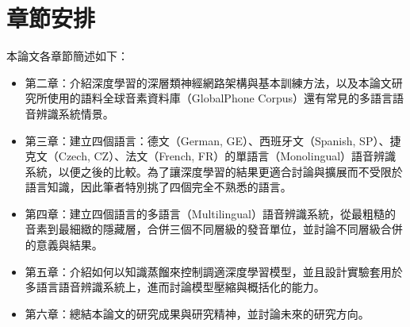 \section{章節安排}
本論文各章節簡述如下：
\begin{itemize}
\itemsep -2pt %
  \item  第二章：介紹深度學習的深層類神經網路架構與基本訓練方法，以及本論文研究所使用的語料全球音素資料庫（GlobalPhone Corpus）還有常見的多語言語音辨識系統情景。

  \item  第三章：建立四個語言：德文（German, GE）、西班牙文（Spanish, SP）、捷克文（Czech, CZ）、法文（French, FR）的單語言（Monolingual）語音辨識系統，以便之後的比較。為了讓深度學習的結果更適合討論與擴展而不受限於語言知識，因此筆者特別挑了四個完全不熟悉的語言。

  \item  第四章：建立四個語言的多語言（Multilingual）語音辨識系統，從最粗糙的音素到最細緻的隱藏層，合併三個不同層級的發音單位，並討論不同層級合併的意義與結果。

  \item  第五章：介紹如何以知識蒸餾來控制調適深度學習模型，並且設計實驗套用於多語言語音辨識系統上，進而討論模型壓縮與概括化的能力。
   
  \item  第六章：總結本論文的研究成果與研究精神，並討論未來的研究方向。
\end{itemize}

